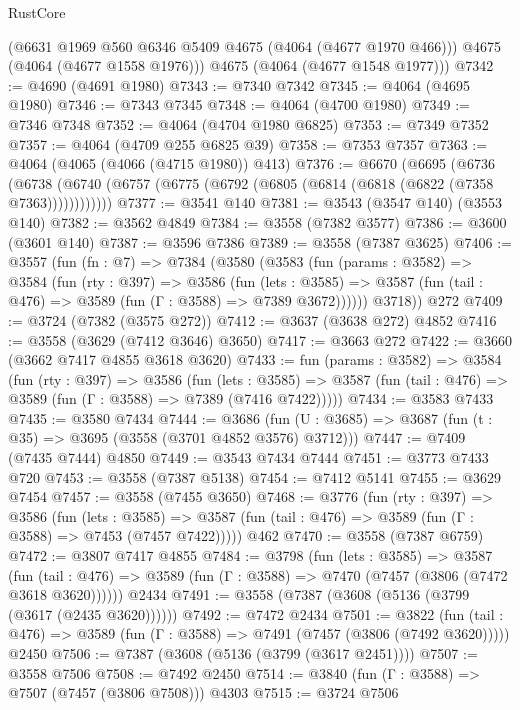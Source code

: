 \begin{lexlean}{RustCore}
\begin{coremodule}
        (@6631 @1969 @560 @6346 @5409 @4675 (@4064 (@4677 @1970 @466)))
        @4675
        (@4064 (@4677 @1558 @1976)))
      @4675
      (@4064 (@4677 @1548 @1977)))
@7342 := @4690 (@4691 @1980)
@7343 := @7340 @7342
@7345 := @4064 (@4695 @1980)
@7346 := @7343 @7345
@7348 := @4064 (@4700 @1980)
@7349 := @7346 @7348
@7352 := @4064 (@4704 @1980 @6825)
@7353 := @7349 @7352
@7357 := @4064 (@4709 @255 @6825 @39)
@7358 := @7353 @7357
@7363 := @4064 (@4065 (@4066 (@4715 @1980)) @413)
@7376 := @6670
    (@6695
      (@6736 (@6738 (@6740 (@6757 (@6775 (@6792 (@6805 (@6814 (@6818 (@6822 (@7358 @7363))))))))))))
@7377 := @3541 @140
@7381 := @3543 (@3547 @140) (@3553 @140)
@7382 := @3562 @4849
@7384 := @3558 (@7382 @3577)
@7386 := @3600 (@3601 @140)
@7387 := @3596 @7386
@7389 := @3558 (@7387 @3625)
@7406 := @3557
    (fun (fn : @7) =>
    @7384
      (@3580
        (@3583
          (fun (params : @3582) =>
          @3584
            (fun (rty : @397) =>
            @3586
              (fun (lets : @3585) =>
              @3587 (fun (tail : @476) => @3589 (fun (Γ : @3588) => @7389 @3672))))))
        @3718))
    @272
@7409 := @3724 (@7382 (@3575 @272))
@7412 := @3637 (@3638 @272) @4852
@7416 := @3558 (@3629 (@7412 @3646) @3650)
@7417 := @3663 @272
@7422 := @3660 (@3662 @7417 @4855 @3618 @3620)
@7433 := fun (params : @3582) =>
  @3584
    (fun (rty : @397) =>
    @3586
      (fun (lets : @3585) =>
      @3587 (fun (tail : @476) => @3589 (fun (Γ : @3588) => @7389 (@7416 @7422)))))
@7434 := @3583 @7433
@7435 := @3580 @7434
@7444 := @3686 (fun (U : @3685) => @3687 (fun (t : @35) => @3695 (@3558 (@3701 @4852 @3576) @3712)))
@7447 := @7409 (@7435 @7444) @4850
@7449 := @3543 @7434 @7444
@7451 := @3773 @7433 @720
@7453 := @3558 (@7387 @5138)
@7454 := @7412 @5141
@7455 := @3629 @7454
@7457 := @3558 (@7455 @3650)
@7468 := @3776
    (fun (rty : @397) =>
    @3586
      (fun (lets : @3585) =>
      @3587 (fun (tail : @476) => @3589 (fun (Γ : @3588) => @7453 (@7457 @7422)))))
    @462
@7470 := @3558 (@7387 @6759)
@7472 := @3807 @7417 @4855
@7484 := @3798
    (fun (lets : @3585) =>
    @3587
      (fun (tail : @476) => @3589 (fun (Γ : @3588) => @7470 (@7457 (@3806 (@7472 @3618 @3620))))))
    @2434
@7491 := @3558 (@7387 (@3608 (@5136 (@3799 (@3617 (@2435 @3620))))))
@7492 := @7472 @2434
@7501 := @3822
    (fun (tail : @476) => @3589 (fun (Γ : @3588) => @7491 (@7457 (@3806 (@7492 @3620)))))
    @2450
@7506 := @7387 (@3608 (@5136 (@3799 (@3617 @2451))))
@7507 := @3558 @7506
@7508 := @7492 @2450
@7514 := @3840 (fun (Γ : @3588) => @7507 (@7457 (@3806 @7508))) @4303
@7515 := @3724 @7506

\end{coremodule}
\end{lexlean}
